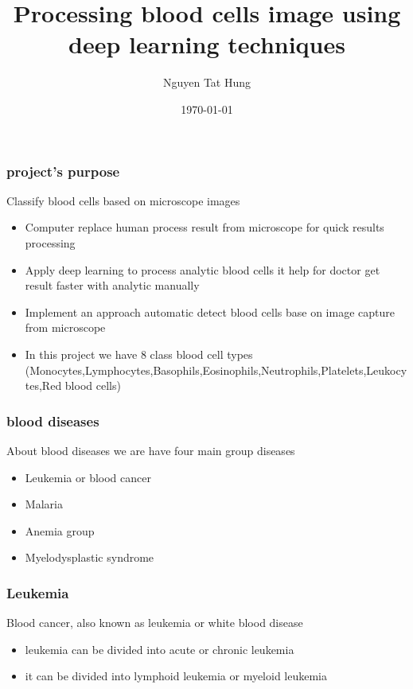 \documentclass{beamer}
\title[]{Processing blood cells image using deep learning techniques } %
\author{Nguyen Tat Hung} %
\institute[USTH] %
{
University science and technology of Ha Noi \\ %
\medskip
\textit{hungnt.m20ict@st.usth.edu.vn} %
}
\date{\today} %
\begin{document}
\begin{frame}
\titlepage %
\end{frame}


\begin{frame}
\frametitle{project's purpose}
Classify blood cells based on microscope images
\begin{itemize}
\item Computer replace human process result from microscope for quick results processing
\item Apply deep learning to process analytic blood cells it help for doctor get result faster with analytic manually
\item Implement an approach automatic detect blood cells base on image capture from microscope
\item In this project we have 8 class blood cell types (Monocytes,Lymphocytes,Basophils,Eosinophils,Neutrophils,Platelets,Leukocytes,Red blood cells)
\end{itemize}
\end{frame}


\begin{frame}
\frametitle{blood diseases}
About blood diseases we are have four main group diseases
\begin{itemize}
\item Leukemia or blood cancer
\item Malaria 
\item Anemia group
\item Myelodysplastic syndrome
\end{itemize}
\end{frame}


\begin{frame}
\frametitle{Leukemia}
Blood cancer, also known as leukemia or white blood disease
\begin{itemize}
\item leukemia can be divided into acute or chronic leukemia
\item it can be divided into lymphoid leukemia or myeloid leukemia 
\end{itemize}
\end{frame}
\end{document}
